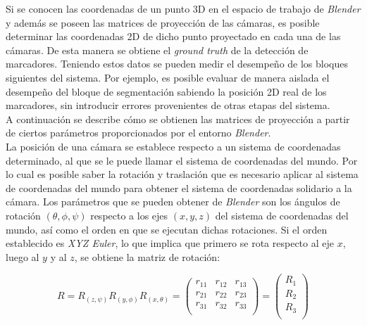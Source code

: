 Si se conocen las coordenadas de un punto 3D en el espacio de trabajo de \emph{Blender} y además se poseen las matrices de proyección de las cámaras, es posible determinar las coordenadas 2D de dicho punto proyectado en cada una de las cámaras. De esta manera se obtiene  el \textit{ground truth} de la detección de marcadores. Teniendo estos datos se pueden medir el desempeño de los bloques siguientes del sistema. Por ejemplo, es posible evaluar de manera aislada el desempeño del bloque de segmentación sabiendo la posición 2D real de los marcadores, sin introducir errores provenientes de otras etapas del sistema.\\

A continuación se describe cómo se obtienen las matrices de proyección a partir de ciertos parámetros proporcionados por el entorno \emph{Blender}.\\

La posición de una cámara se establece respecto a un sistema de coordenadas determinado, al que se le puede llamar el sistema de coordenadas del mundo. Por lo cual es posible saber la rotación y traslación que es necesario aplicar al sistema de coordenadas del mundo para obtener el sistema de coordenadas solidario a la cámara. Los parámetros que se pueden obtener de \emph{Blender} son los ángulos de rotación $(\theta, \phi, \psi )$ respecto a los ejes $(x,y, z)$ del sistema de coordenadas del mundo, así como el orden en que se ejecutan dichas rotaciones. Si el orden establecido es \textit{XYZ Euler}, lo que implica que primero se rota respecto al eje $x$, luego al $y$ y al $z$, se obtiene la matriz de rotación:

\[R=R_{(z,\psi)}R_{(y,\phi)}R_{(x,\theta)}
= \begin{pmatrix}
		r_{11} & r_{12} & r_{13}\\
		r_{21} & r_{22} & r_{23}\\
		r_{31} & r_{32} & r_{33}\\ 
\end{pmatrix}= 
\begin{pmatrix}
			R_1 \\
			R_2 \\
			R_3 \\
		\end{pmatrix}
\]
 
